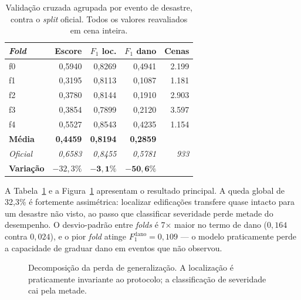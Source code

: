 \documentclass[11pt,a4paper]{article}
\begin{document}
\begin{table}[htbp]
\centering
\caption{Validação cruzada agrupada por evento de desastre, contra o
\emph{split} oficial. Todos os valores reavaliados em cena inteira.}
\label{tab:folds}
\begin{tabular}{lrrrr}
\toprule
\textbf{\emph{Fold}} & \textbf{Escore} & \textbf{$F_1$ loc.} &
\textbf{$F_1$ dano} & \textbf{Cenas} \\
\midrule
f0 & 0{,}5940 & 0{,}8269 & 0{,}4941 & 2.199 \\
f1 & 0{,}3195 & 0{,}8113 & 0{,}1087 & 1.181 \\
f2 & 0{,}3780 & 0{,}8144 & 0{,}1910 & 2.903 \\
f3 & 0{,}3854 & 0{,}7899 & 0{,}2120 & 3.597 \\
f4 & 0{,}5527 & 0{,}8543 & 0{,}4235 & 1.154 \\
\midrule
\textbf{Média} & \textbf{0{,}4459} & \textbf{0{,}8194} & \textbf{0{,}2859} & \\
\emph{Oficial} & \emph{0{,}6583} & \emph{0{,}8455} & \emph{0{,}5781} & \emph{933} \\
\midrule
\textbf{Variação} & $-32{,}3\%$ & $\mathbf{-3{,}1\%}$ & $\mathbf{-50{,}6\%}$ & \\
\bottomrule
\end{tabular}
\end{table}

A Tabela~\ref{tab:folds} e a Figura~\ref{fig:gap} apresentam o resultado
principal. A queda global de 32{,}3\% é fortemente assimétrica: localizar
edificações transfere quase intacto para um desastre não visto, ao passo que
classificar severidade perde metade do desempenho. O desvio-padrão entre
\emph{folds} é 7$\times$ maior no termo de dano ($0{,}164$ contra $0{,}024$), e o
pior \emph{fold} atinge $F_1^{\text{dano}} = 0{,}109$ --- o modelo praticamente
perde a capacidade de graduar dano em eventos que não observou.

\begin{figure}[htbp]
\centering
{}
\caption{Decomposição da perda de generalização. A localização é praticamente
invariante ao protocolo; a classificação de severidade cai pela metade.}
\label{fig:gap}
\end{figure}
\end{document}
